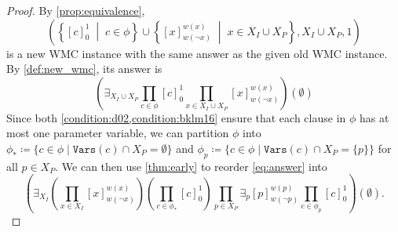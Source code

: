 \documentclass{article}
\theoremstyle{definition}
\theoremstyle{remark}
\begin{document}
\begin{proof} %
  By \cref{prop:equivalence},
  \begin{equation}
    \left(\left\{[c]_0^1 \;\middle|\; c \in \phi\right\} \cup \left\{[x]_{w(\neg
          x)}^{w(x)} \;\middle|\; x \in X_I \cup X_P\right\}, X_I \cup X_P,
      1\right) \label{eq:new_wmc}
  \end{equation}
  is a new WMC instance with the same answer as the given old WMC instance. By
  \cref{def:new_wmc}, its answer is
  \begin{equation} \label{eq:answer}
    \left(\exists_{X_I \cup X_P} \prod_{c \in \phi} [c]_0^1 \prod_{x \in X_I
        \cup X_P} [x]_{w(\neg x)}^{w(x)} \right)(\emptyset)
  \end{equation}
  Since both \cref{condition:d02,condition:bklm16} ensure that each clause in
  $\phi$ has at most one parameter variable, we can partition $\phi$ into
  $\phi_* \coloneqq \{c \in \phi \mid \mathtt{Vars}(c) \cap X_P = \emptyset \}$
  and $\phi_p \coloneqq \{ c \in \phi \mid \mathtt{Vars}(c) \cap X_P = \{ p \}
  \}$ for all $p \in X_P$. We can then use \cref{thm:early} to reorder
  \cref{eq:answer} into
  \[
    \left(\exists_{X_I} \left( \prod_{x \in X_I} [x]_{w(\neg x)}^{w(x)} \right)
      \left( \prod_{c \in \phi_*} [c]_0^1 \right) \prod_{p \in X_P} \exists_p
      [p]_{w(\neg p)}^{w(p)} \prod_{c \in \phi_p} [c]_0^1 \right)(\emptyset).
  \]


\end{proof}
\end{document}
